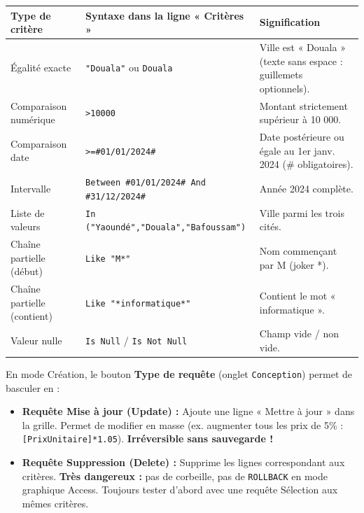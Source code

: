 \documentclass[11pt]{article}
\begin{document}
\begin{exemplebox}
\begin{center}
\begin{tabularx}{\linewidth}{|l|X|l|}
\hline
\rowcolor{popblueL}
\textbf{Type de critère} & \textbf{Syntaxe dans la ligne « Critères »} & \textbf{Signification} \\
\hline
Égalité exacte & \texttt{"Douala"} ou \texttt{Douala} & Ville est « Douala » (texte sans espace : guillemets optionnels). \\
Comparaison numérique & \texttt{>10000} & Montant strictement supérieur à 10 000. \\
Comparaison date & \texttt{>=\#01/01/2024\#} & Date postérieure ou égale au 1er janv. 2024 (\# obligatoires). \\
Intervalle & \texttt{Between \#01/01/2024\# And \#31/12/2024\#} & Année 2024 complète. \\
Liste de valeurs & \texttt{In ("Yaoundé","Douala","Bafoussam")} & Ville parmi les trois cités. \\
Chaîne partielle (début) & \texttt{Like "M*"} & Nom commençant par M (joker *). \\
Chaîne partielle (contient) & \texttt{Like "*informatique*"} & Contient le mot « informatique ». \\
Valeur nulle & \texttt{Is Null} / \texttt{Is Not Null} & Champ vide / non vide. \\
\hline
\end{tabularx}
\end{center}
\end{exemplebox}

\begin{attention}
En mode Création, le bouton \textbf{Type de requête} (onglet \texttt{Conception}) permet de basculer en :
\begin{itemize}
    \item \textbf{Requête Mise à jour (Update) :} Ajoute une ligne « Mettre à jour » dans la grille. Permet de modifier en masse (ex. augmenter tous les prix de 5\% : \texttt{[PrixUnitaire]*1.05}). \textbf{Irréversible sans sauvegarde !}
    \item \textbf{Requête Suppression (Delete) :} Supprime les lignes correspondant aux critères. \textbf{Très dangereux :} pas de corbeille, pas de \texttt{ROLLBACK} en mode graphique Access. Toujours tester d'abord avec une requête Sélection aux mêmes critères.
\end{itemize}
\end{attention}
\end{document}
